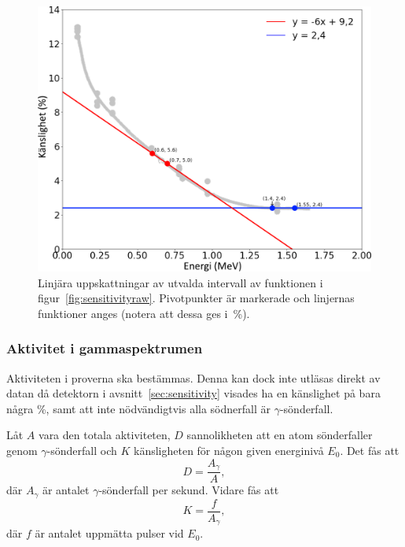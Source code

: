 \begin{figure}[!hp]
    \centering
    \includegraphics[width=\textwidth, keepaspectratio]{../images/sensitivity.png}
    \caption{
        Linjära uppskattningar av utvalda intervall av funktionen i
        figur~\ref{fig:sensitivityraw}. Pivotpunkter är markerade och linjernas
        funktioner anges (notera att dessa ges i~\unit{\percent}).
    }
    \label{fig:sensitivity}
\end{figure}

\subsubsection{Aktivitet i gammaspektrumen} \label{sec:activity}

Aktiviteten i proverna ska bestämmas. Denna kan dock inte utläsas direkt av
datan då detektorn i avsnitt~\ref{sec:sensitivity} visades ha en känslighet
på bara några \unit{\percent}, samt att inte nödvändigtvis alla södnerfall är
$\gamma$-sönderfall.

Låt $A$ vara den totala aktiviteten, $D$ sannolikheten att en atom
sönderfaller genom $\gamma$-sönderfall och $K$ känsligheten för någon given
energinivå $E_0$. Det fås att
%
\begin{equation}
    D = \frac{A_\gamma}{A} \label{eq:sharegamma},
\end{equation}
%
där $A_\gamma$ är antalet $\gamma$-sönderfall per sekund. Vidare fås att
%
\begin{equation}
    K = \frac{f}{A_\gamma} \label{eq:sensitivity},
\end{equation}
%
där $f$ är antalet uppmätta pulser vid $E_0$.

